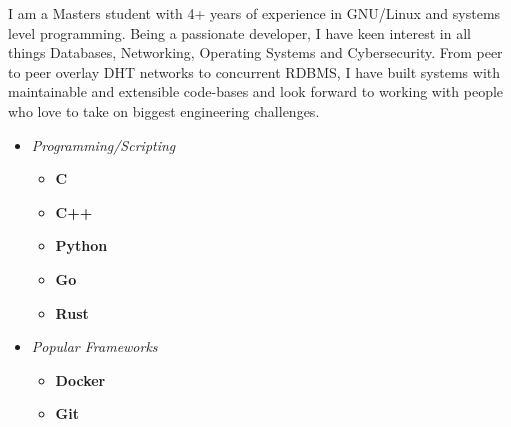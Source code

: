 \documentclass[9]{Resume}
\begin{document}
\begin{minipage}[t]{0.45\textwidth}
	\vspace{-\baselineskip}

		I am a Masters student with 4+ years of experience in GNU/Linux and systems level programming.
		Being a passionate developer, I have keen interest in all things Databases, Networking, Operating Systems and Cybersecurity.
		From peer to peer overlay DHT networks to concurrent RDBMS, I have built systems with maintainable and extensible code-bases and look forward to working with people who love to take on biggest engineering challenges.
\end{minipage}
\hfill
\begin{minipage}[t]{0.45\textwidth}
	\vspace{-\baselineskip}

	\begin{itemize}[noitemsep,nolistsep,leftmargin=*]
	\setlength\itemsep{-1em}
	\item[]\textit{Programming/Scripting}
			\vspace{-1em}
			\begin{multicols}{2}
			\begin{itemize}[leftmargin=*]
			\setlength\itemsep{-0.25em}
				\item[]\textbf{C}\hspace{48pt}
				\item[]\textbf{C++}\hspace{37pt}
				\item[]\textbf{Python}\hspace{25pt}
				\item[]\textbf{Go}\hspace{28pt}
				\item[]\textbf{Rust}\hspace{21pt}
			\end{itemize}
			\end{multicols}

	\item[]\textit{Popular Frameworks}
			\vspace{-1em}
			\begin{multicols}{2}
			\begin{itemize}[leftmargin=*]
			\setlength\itemsep{-0.25em}
				\item[]\textbf{Docker}\hspace{25pt}\meter{4}
				\item[]\textbf{Git}\hspace{27pt}\meter{4}
			\end{itemize}
			\end{multicols}


\end{itemize}
\end{minipage}
\end{document}
